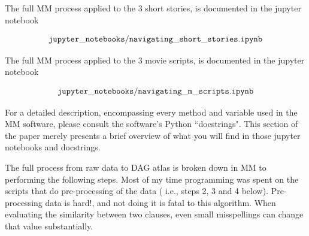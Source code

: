 \documentclass[12pt]{article}
\begin{document}
The full MM process applied to the 3 short stories,
is documented in the jupyter notebook

$$\tt jupyter\_notebooks/navigating\_short\_stories.ipynb$$

The full MM process applied to the 3 movie scripts,
is documented in the jupyter notebook

$$\tt jupyter\_notebooks/navigating\_m\_scripts.ipynb$$

For a detailed description, encompassing 
every method and variable used in the
MM software,
please consult the software's Python ``docstrings".
This section of the paper merely
presents a brief overview of what you
will find in those jupyter notebooks and docstrings.

The full process from raw data to DAG atlas
is broken down in MM to
performing the following steps. 
Most of my time programming
was spent on the scripts that do
pre-processing of the data (
i.e., steps 2, 3 and 4 below).
Pre-processing data is hard!,
and not doing it is fatal
to this algorithm. When 
evaluating the similarity between
two clauses,
even small misspellings can 
change that value substantially.
 
\end{document}
